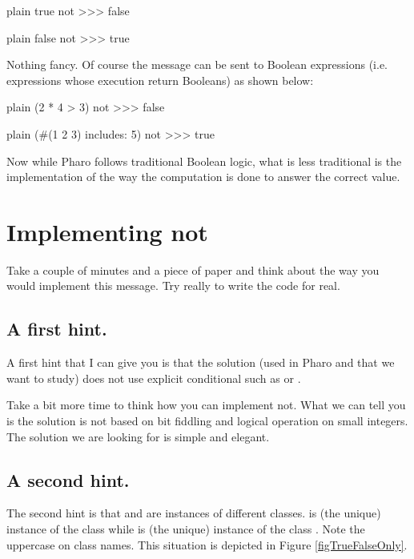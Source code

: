 \documentclass[10pt,twoside,english]{_support/latex/sbabook/sbabook}
\begin{document}
\begin{displaycode}{plain}
true not
>>> false
\end{displaycode}

\begin{displaycode}{plain}
false not
>>> true
\end{displaycode}

Nothing fancy. Of course the message  can be sent to Boolean expressions (i.e. expressions whose execution return Booleans) as shown below:

\begin{displaycode}{plain}
(2 * 4 > 3) not
>>> false
\end{displaycode}

\begin{displaycode}{plain}
(#(1 2 3) includes: 5) not
>>> true
\end{displaycode}

Now while Pharo follows traditional Boolean logic, what is less traditional is the implementation of the way the computation is done to answer the correct value.
\section{Implementing not}
Take a couple of minutes and a piece of paper and think about the way you would implement this message. Try really to write the code for real.
\subsection{A first hint. }
A first hint that I can give you is that the solution (used in Pharo and that we want to study) does not use explicit conditional such as  or .

Take a bit more time to think how you can implement not. 
What we can tell you is the solution is not based on bit fiddling and logical operation on small integers. The solution we are looking for is simple and elegant.
\subsection{A second hint.}
The second hint is that  and  are instances of different classes.  is (the unique) instance of the class  while  is (the unique) instance of the class . Note the uppercase on class names. This situation is depicted in Figure \ref{figTrueFalseOnly}.
\end{document}
